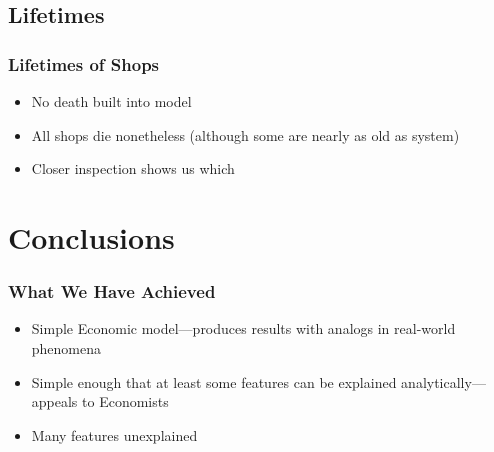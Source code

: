 \documentclass{beamer}
\begin{document}
\subsection{Lifetimes}
\frame
{
  \frametitle{Lifetimes of Shops}
  \begin{minipage}{0.4\textwidth}
    \begin{itemize}
      \setlength{\itemsep}{\baselineskip}
    \item<1-> No death built into model
    \item<2-> All shops die nonetheless (although some are nearly as
      old as system)
    \item<3-> Closer inspection shows us which
    \end{itemize}
  \end{minipage}
  \begin{minipage}{0.5\textwidth}
     
  \end{minipage}
}

\section{Conclusions}

\frame
{
  \frametitle{What We Have Achieved}
  \begin{itemize}
    \setlength{\itemsep}{\baselineskip}
  \item<1-> Simple Economic model---produces results with analogs in
    real-world phenomena
  \item<2-> Simple enough that at least some features can be explained
    analytically---appeals to Economists
  \item<3-> Many features unexplained
  \end{itemize}
}
\end{document}
